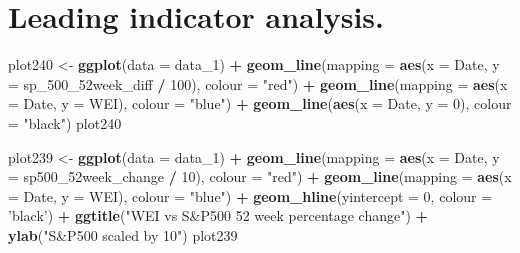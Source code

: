 \documentclass[]{article}
\newenvironment{Shaded}{\begin{snugshade}}{\end{snugshade}}
\newcommand{\KeywordTok}[1]{\textcolor[rgb]{0.13,0.29,0.53}{\textbf{#1}}}
\newcommand{\DataTypeTok}[1]{\textcolor[rgb]{0.13,0.29,0.53}{#1}}
\newcommand{\DecValTok}[1]{\textcolor[rgb]{0.00,0.00,0.81}{#1}}
\newcommand{\StringTok}[1]{\textcolor[rgb]{0.31,0.60,0.02}{#1}}
\newcommand{\OperatorTok}[1]{\textcolor[rgb]{0.81,0.36,0.00}{\textbf{#1}}}
\newcommand{\NormalTok}[1]{#1}
\begin{document}
\section{Leading indicator analysis.}\label{leading-indicator-analysis.}

\begin{Shaded}
\begin{Highlighting}[]
\NormalTok{plot240 <-}\StringTok{ }\KeywordTok{ggplot}\NormalTok{(}\DataTypeTok{data =}\NormalTok{ data_}\DecValTok{1}\NormalTok{) }\OperatorTok{+}\StringTok{ }
\StringTok{  }\KeywordTok{geom_line}\NormalTok{(}\DataTypeTok{mapping =} \KeywordTok{aes}\NormalTok{(}\DataTypeTok{x =}\NormalTok{ Date, }\DataTypeTok{y =}\NormalTok{ sp_500_52week_diff }\OperatorTok{/}\StringTok{ }\DecValTok{100}\NormalTok{), }\DataTypeTok{colour =} \StringTok{"red"}\NormalTok{) }\OperatorTok{+}
\StringTok{  }\KeywordTok{geom_line}\NormalTok{(}\DataTypeTok{mapping =} \KeywordTok{aes}\NormalTok{(}\DataTypeTok{x =}\NormalTok{ Date, }\DataTypeTok{y =}\NormalTok{ WEI), }\DataTypeTok{colour =} \StringTok{"blue"}\NormalTok{) }\OperatorTok{+}\StringTok{ }
\StringTok{  }\KeywordTok{geom_line}\NormalTok{(}\KeywordTok{aes}\NormalTok{(}\DataTypeTok{x =}\NormalTok{ Date, }\DataTypeTok{y =} \DecValTok{0}\NormalTok{), }\DataTypeTok{colour =} \StringTok{"black"}\NormalTok{)}
\NormalTok{plot240}

\NormalTok{plot239 <-}\StringTok{ }\KeywordTok{ggplot}\NormalTok{(}\DataTypeTok{data =}\NormalTok{ data_}\DecValTok{1}\NormalTok{) }\OperatorTok{+}
\StringTok{  }\KeywordTok{geom_line}\NormalTok{(}\DataTypeTok{mapping =} \KeywordTok{aes}\NormalTok{(}\DataTypeTok{x =}\NormalTok{ Date, }\DataTypeTok{y =}\NormalTok{ sp500_52week_change }\OperatorTok{/}\StringTok{ }\DecValTok{10}\NormalTok{), }\DataTypeTok{colour =} \StringTok{"red"}\NormalTok{) }\OperatorTok{+}\StringTok{ }
\StringTok{  }\KeywordTok{geom_line}\NormalTok{(}\DataTypeTok{mapping =} \KeywordTok{aes}\NormalTok{(}\DataTypeTok{x =}\NormalTok{ Date, }\DataTypeTok{y =}\NormalTok{ WEI), }\DataTypeTok{colour =} \StringTok{"blue"}\NormalTok{) }\OperatorTok{+}
\StringTok{  }\KeywordTok{geom_hline}\NormalTok{(}\DataTypeTok{yintercept =} \DecValTok{0}\NormalTok{, }\DataTypeTok{colour =} \StringTok{'black'}\NormalTok{) }\OperatorTok{+}\StringTok{ }
\StringTok{  }\KeywordTok{ggtitle}\NormalTok{(}\StringTok{"WEI vs S&P500 52 week percentage change"}\NormalTok{) }\OperatorTok{+}\StringTok{ }
\StringTok{  }\KeywordTok{ylab}\NormalTok{(}\StringTok{"S&P500 scaled by 10"}\NormalTok{)}
\NormalTok{plot239}
\end{Highlighting}
\end{Shaded}
\end{document}
